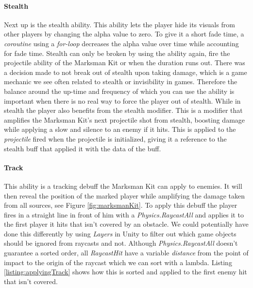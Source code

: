 \paragraph{Stealth}
Next up is the stealth ability. This ability lets the player hide its visuals from other players by changing the alpha value to zero. To give it a short fade time, a \emph{coroutine} using a \emph{for-loop} decreases the alpha value over time while accounting for fade time. Stealth can only be broken by using the ability again, fire the projectile ability of the Marksman Kit or when the duration runs out. There was a decision made to not break out of stealth upon taking damage, which is a game mechanic we see often related to stealth or invisibility in games. Therefore the balance around the up-time and frequency of which you can use the ability is important when there is no real way to force the player out of stealth. While in stealth the player also benefits from the stealth modifier. This is a modifier that amplifies the Marksman Kit's next projectile shot from stealth, boosting damage while applying a slow and silence to an enemy if it hits. This is applied to the \emph{projectile} fired when the projectile is initialized, giving it a reference to the stealth buff that applied it with the data of the buff.

\paragraph{Track}
This ability is a tracking debuff the Marksman Kit can apply to enemies. It will then reveal the position of the marked player while amplifying the damage taken from all sources, see Figure \ref{fig:marksmanKit}. To apply this debuff the player fires in a straight line in front of him with a \emph{Physics.RaycastAll} and applies it to the first player it hits that isn't covered by an obstacle. We could potentially have done this differently by using \emph{Layers} in Unity to filter out which game objects should be ignored from raycasts and not. Although \emph{Physics.RaycastAll} doesn't guarantee a sorted order, all \emph{RaycastHit} have a variable \emph{distance} from the point of impact to the origin of the raycast which we can sort with a lambda. Listing \ref{listing:applyingTrack} shows how this is sorted and applied to the first enemy hit that isn't covered.

